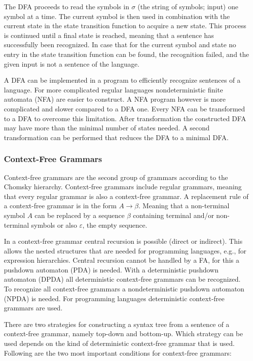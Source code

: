 The DFA proceeds to read the symbols in $\sigma$ (the string of symbols; input) one symbol at a time. The current symbol is then used in combination with the current state in the state transition function to acquire a new state. This process is continued until a final state is reached, meaning that a sentence has successfully been recognized. In case that for the current symbol and state no entry in the state transition function can be found, the recognition failed, and the given input is not a sentence of the language. 

A DFA can be implemented in a program to efficiently recognize sentences of a language. For more complicated regular languages nondeterministic finite automata (NFA) are easier to construct. A NFA program however is more complicated and slower compared to a DFA one. Every NFA can be transformed to a DFA to overcome this limitation. After transformation the constructed DFA may have more than the minimal number of states needed. A second transformation can be performed that reduces the DFA to a minimal DFA. 

\subsubsection{Context-Free Grammars}

Context-free grammars are the second group of grammars according to the Chomsky hierarchy. Context-free grammars include regular grammars, meaning that every regular grammar is also a context-free grammar. A replacement rule of a context-free grammar is in the form $A \rightarrow \beta$. Meaning that a non-terminal symbol $A$ can be replaced by a sequence $\beta$ containing terminal and/or non-terminal symbols or also $\varepsilon$, the empty sequence. 

In a context-free grammar central recursion is possible (direct or indirect). This allows the nested structures that are needed for programming languages, e.g., for expression hierarchies. Central recursion cannot be handled by a FA, for this a pushdown automaton (PDA) is needed. With a deterministic pushdown automaton (DPDA) all deterministic context-free grammars can be recognized. To recognize all context-free grammars a nondeterministic pushdown automaton (NPDA) is needed. For programming languages deterministic context-free grammars are used. 

There are two strategies for constructing a syntax tree from a sentence of a context-free grammar, namely top-down and bottom-up. Which strategy can be used depends on the kind of deterministic context-free grammar that is used. Following are the two most important conditions for context-free grammars:

